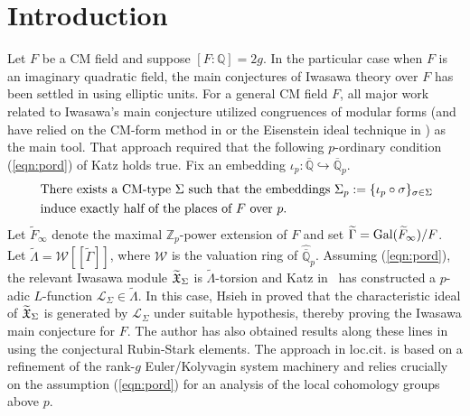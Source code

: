 \documentclass[12pt]{amsart}
\numberwithin{equation}{section}
\begin{document}
\section{Introduction}
\label{sec:intro}
Let $F$ be a CM field and suppose $[F:{\mathbb{Q}}]=2g$. In the particular case when $F$ is an imaginary quadratic field, the main conjectures of Iwasawa theory over $F$ has been settled in \cite{rubinmainconj} using elliptic units. For a general CM field $F$, all major work related to Iwasawa's main conjecture utilized congruences of modular forms (and have relied on the CM-form method in \cite{ht93,ht94} or the Eisenstein ideal technique in \cite{mainardi,hsiehCMmainconj}) as the main tool. That approach required that the following $p$-ordinary condition (\ref{eqn:pord}) of Katz holds true. Fix an embedding $\iota_p: \overline{\mathbb{Q}}\hookrightarrow \overline{\mathbb{Q}}_p$.
 \begin{align}\label{eqn:pord}& \textup{ There exists a CM-type } \Sigma \textup{ such that the embeddings } \Sigma_p:=\{\iota_p\circ \sigma\}_{\sigma \in \Sigma}  \\
 \notag &\textup{ induce exactly half of the places of } F \textup{ over } p.\end{align}
Let $\widetilde{F}_\infty$ denote the maximal ${\mathbb{Z}}_p$-power extension of $F$ and set $\widetilde{\Gamma}=\textup{Gal}(\widetilde{F}_\infty)/F$. Let $\widetilde{\Lambda}=\mathcal{W}[[\widetilde{\Gamma}]]$, where $\mathcal{W}$ is the valuation ring of $\widehat{\overline{\mathbb{Q}}}_p$. Assuming (\ref{eqn:pord}), the relevant Iwasawa module $\widetilde{\frak{X}}_\Sigma$ is $\widetilde{\Lambda}$-torsion and Katz in~\cite{katz78} has constructed a $p$-adic $L$-function ${\mathcal{L}}_\Sigma \in \widetilde{\Lambda}$. In this case, Hsieh in \cite{hsiehCMmainconj} proved that the characteristic ideal of $\widetilde{\frak{X}}_\Sigma$ is generated by ${\mathcal{L}}_\Sigma$ under suitable hypothesis, thereby proving the Iwasawa main conjecture for $F$. The author has also obtained results along these lines in~\cite{kbbCMabvar} using the conjectural Rubin-Stark elements. The approach in loc.cit. is based on a refinement of the rank-$g$ Euler/Kolyvagin system machinery and  relies crucially on the assumption (\ref{eqn:pord}) for an analysis of the local cohomology groups above $p$.
\end{document}
